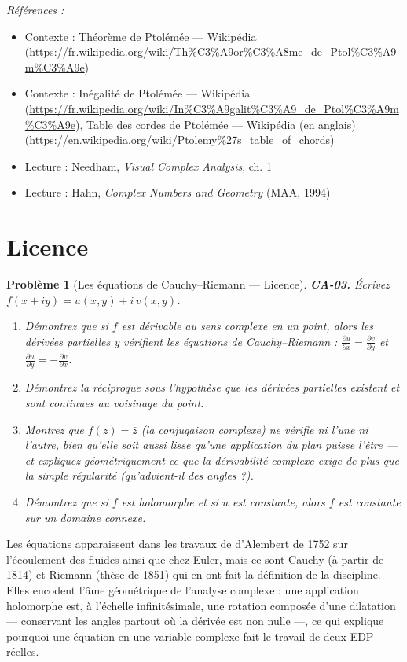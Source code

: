 \documentclass[11pt]{article}
\newtheorem{problem}{Problème}
\newenvironment{refs}{\par\small\noindent\emph{Références :}\begin{itemize}\setlength\itemsep{0pt}}{\end{itemize}\normalsize}
\begin{document}
\begin{refs}
\item Contexte : Théorème de Ptolémée --- Wikipédia (\url{https://fr.wikipedia.org/wiki/Th%C3%A9or%C3%A8me_de_Ptol%C3%A9m%C3%A9e})
\item Contexte : Inégalité de Ptolémée --- Wikipédia (\url{https://fr.wikipedia.org/wiki/In%C3%A9galit%C3%A9_de_Ptol%C3%A9m%C3%A9e}), Table des cordes de Ptolémée --- Wikipédia (en anglais) (\url{https://en.wikipedia.org/wiki/Ptolemy%27s_table_of_chords})
\item Lecture : Needham, \textit{Visual Complex Analysis}, ch. 1
\item Lecture : Hahn, \textit{Complex Numbers and Geometry} (MAA, 1994)
\end{refs}

\bigskip


\section*{Licence}

\begin{problem}[{Les équations de Cauchy--Riemann --- Licence}]
\textbf{CA-03.} Écrivez $ f(x + iy) = u(x, y) + i\,v(x, y) $.
\begin{enumerate}
\item[(a)] Démontrez que si $ f $ est dérivable au sens complexe en un point, alors les dérivées
partielles y vérifient les équations de Cauchy--Riemann :
$ \frac{\partial u}{\partial x} = \frac{\partial v}{\partial y} $ et
$ \frac{\partial u}{\partial y} = -\frac{\partial v}{\partial x} $.
\item[(b)] Démontrez la réciproque sous l'hypothèse que les dérivées partielles existent et sont continues
au voisinage du point.
\item[(c)] Montrez que $ f(z) = \bar{z} $ (la conjugaison complexe) ne vérifie ni l'une ni l'autre,
bien qu'elle soit aussi lisse qu'une application du plan puisse l'être --- et expliquez
géométriquement ce que la dérivabilité complexe exige de plus que la simple régularité (qu'advient-il
des angles ?).
\item[(d)] Démontrez que si $ f $ est holomorphe et si $ u $ est constante, alors $ f $ est constante
sur un domaine connexe.
\end{enumerate}

\end{problem}

\noindent Les équations apparaissent dans les travaux de d'Alembert de 1752 sur
l'écoulement des fluides ainsi que chez Euler, mais ce sont Cauchy (à partir de 1814) et Riemann
(thèse de 1851) qui en ont fait la définition de la discipline. Elles encodent l'âme géométrique de
l'analyse complexe : une application holomorphe est, à l'échelle infinitésimale, une rotation
composée d'une dilatation --- conservant les angles partout où la dérivée est non nulle ---, ce qui
explique pourquoi une équation en une variable complexe fait le travail de deux EDP réelles.
\end{document}
